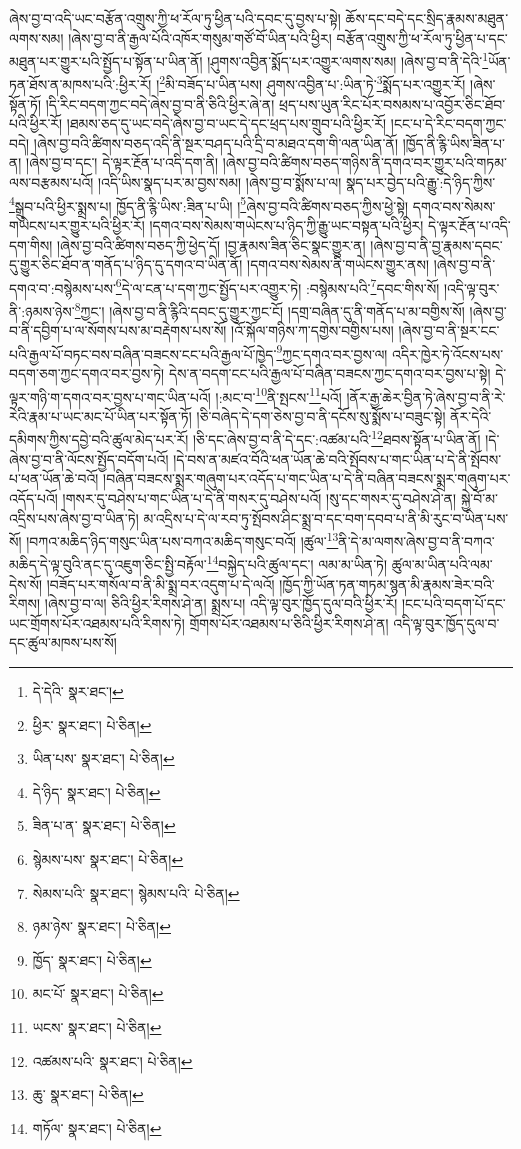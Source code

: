 ཞེས་བྱ་བ་འདི་ཡང་བརྩོན་འགྲུས་ཀྱི་ཕ་རོལ་ཏུ་ཕྱིན་པའི་དབང་དུ་བྱས་པ་སྟེ། ཆོས་དང་བདེ་དང་སྲིད་རྣམས་མཐུན་ལགས་སམ། །ཞེས་བྱ་བ་ནི་རྒྱལ་པོའི་འཁོར་གསུམ་གཙོ་བོ་ཡིན་པའི་ཕྱིར། བརྩོན་འགྲུས་ཀྱི་ཕ་རོལ་ཏུ་ཕྱིན་པ་དང་མཐུན་པར་གྱུར་པའི་སྤྱོད་པ་སྟོན་པ་ཡིན་ནོ། །ཤུགས་འབྱིན་སྨོད་པར་འགྱུར་ལགས་སམ། །ཞེས་བྱ་བ་ནི་དེའི་\footnote{དེ་དེའི་  སྣར་ཐང་། }ཡོན་ཏན་ཐོས་ན་མཁས་པའི་:ཕྱིར་རོ། །\footnote{ཕྱིར་  སྣར་ཐང་།  པེ་ཅིན། }མི་བཟོད་པ་ཡིན་པས། ཤུགས་འབྱིན་པ་:ཡིན་ཏེ་\footnote{ཡིན་པས་  སྣར་ཐང་།  པེ་ཅིན། }སྨོད་པར་འགྱུར་རོ། །ཞེས་སྟོན་ཏོ། །དི་རིང་བདག་ཀྱང་བདེ་ཞེས་བྱ་བ་ནི་ཅིའི་ཕྱིར་ཞེ་ན། ཕྲད་པས་ཡུན་རིང་པོར་བསམས་པ་འབྱོར་ཅིང་ཐོབ་པའི་ཕྱིར་རོ། །ཐམས་ཅད་དུ་ཡང་བདེ་ཞེས་བྱ་བ་ཡང་དེ་དང་ཕྲད་པས་གྲུབ་པའི་ཕྱིར་རོ། །ངང་པ་དེ་རིང་བདག་ཀྱང་བདེ། །ཞེས་བྱ་བའི་ཚིགས་བཅད་འདི་ནི་སྔར་བཤད་པའི་དྲི་བ་མཐའ་དག་གི་ལན་ཡིན་ནོ། །ཁྱོད་ནི་རྙི་ཡིས་ཟིན་པ་ན། །ཞེས་བྱ་བ་དང་། དེ་ལྟར་རྔོན་པ་འདི་དག་ནི། །ཞེས་བྱ་བའི་ཚིགས་བཅད་གཉིས་ནི་དགའ་བར་གྱུར་པའི་གཏམ་ལས་བརྩམས་པའོ། །འདི་ཡིས་སྣད་པར་མ་བྱས་སམ། །ཞེས་བྱ་བ་སྨོས་པ་ལ། སྣད་པར་བྱེད་པའི་རྒྱུ་:དེ་ཉིད་ཀྱིས་\footnote{དེ་ཉིད་  སྣར་ཐང་།  པེ་ཅིན། }སྒྲུབ་པའི་ཕྱིར་སྨྲས་པ། ཁྱོད་ནི་རྙི་ཡིས་:ཟིན་པ་ཡི། །\footnote{ཟིན་པ་ན་  སྣར་ཐང་།  པེ་ཅིན། }ཞེས་བྱ་བའི་ཚིགས་བཅད་ཀྱིས་ཕྱེ་སྟེ། དགའ་བས་སེམས་གཡེངས་པར་གྱུར་པའི་ཕྱིར་རོ། །དགའ་བས་སེམས་གཡེངས་པ་ཉིད་ཀྱི་རྒྱུ་ཡང་བསྟན་པའི་ཕྱིར། དེ་ལྟར་རྔོན་པ་འདི་དག་གིས། །ཞེས་བྱ་བའི་ཚིགས་བཅད་ཀྱི་ཕྱེད་དོ། །བྱ་རྣམས་ཟིན་ཅིང་སྣང་གྱུར་ན། །ཞེས་བྱ་བ་ནི་བྱ་རྣམས་དབང་དུ་གྱུར་ཅིང་ཐོབ་ན་གནོད་པ་ཉིད་དུ་དགའ་བ་ཡིན་ནོ། །དགའ་བས་སེམས་ནི་གཡེངས་གྱུར་ནས། །ཞེས་བྱ་བ་ནི་དགའ་བ་:བསྙེམས་པས་\footnote{སྙེམས་པས་  སྣར་ཐང་།  པེ་ཅིན། }དེ་ལ་ངན་པ་དག་ཀྱང་སྤྱོད་པར་འགྱུར་ཏེ། :བསྙེམས་པའི་\footnote{སེམས་པའི་  སྣར་ཐང་། སྙེམས་པའི་  པེ་ཅིན། }དབང་གིས་སོ། །འདི་ལྟ་བུར་ནི་:ཉམས་ཉེས་\footnote{ཉམ་ཉེས་  སྣར་ཐང་།  པེ་ཅིན། }ཀྱང་། །ཞེས་བྱ་བ་ནི་རྙིའི་དབང་དུ་གྱུར་ཀྱང་ངོ། །དགྲ་བཞིན་དུ་ནི་གནོད་པ་མ་བགྱིས་སོ། །ཞེས་བྱ་བ་ནི་དབྱིག་པ་ལ་སོགས་པས་མ་བརྡེགས་པས་སོ། །འོ་སྐོལ་གཉིས་ཀ་དགྱེས་བགྱིས་པས། །ཞེས་བྱ་བ་ནི་སྔར་ངང་པའི་རྒྱལ་པོ་བཏང་བས་བཞིན་བཟངས་ངང་པའི་རྒྱལ་པོ་ཁྱེད་\footnote{ཁྱོད་  སྣར་ཐང་།  པེ་ཅིན། }ཀྱང་དགའ་བར་བྱས་ལ། འདིར་ཁྱེར་ཏེ་འོངས་པས་བདག་ཅག་ཀྱང་དགའ་བར་བྱས་ཏེ། དེས་ན་བདག་ངང་པའི་རྒྱལ་པོ་བཞིན་བཟངས་ཀྱང་དགའ་བར་བྱས་པ་སྟེ། དེ་ལྟར་གཉི་ག་དགའ་བར་བྱས་པ་གང་ཡིན་པའོ། །:མང་བ་\footnote{མང་པོ་  སྣར་ཐང་།  པེ་ཅིན། }ནི་སྤངས་\footnote{ཡངས་  སྣར་ཐང་།  པེ་ཅིན། }པའོ། །ནོར་རྒྱ་ཆེར་བྱིན་ཏེ་ཞེས་བྱ་བ་ནི་རེ་རེའི་རྣམ་པ་ཡང་མང་པོ་ཡིན་པར་སྟོན་ཏོ། །ཅི་བཞེད་དེ་དག་ཅེས་བྱ་བ་ནི་དངོས་སུ་སྨོས་པ་བཟུང་སྟེ། ནོར་དེའི་དམིགས་ཀྱིས་དབྱེ་བའི་ཚུལ་མེད་པར་རོ། །ཅི་དང་ཞེས་བྱ་བ་ནི་དེ་དང་:འཚམ་པའི་\footnote{འཚམས་པའི་  སྣར་ཐང་།  པེ་ཅིན། }ཐབས་སྟོན་པ་ཡིན་ནོ། །དེ་ཞེས་བྱ་བ་ནི་ལོངས་སྤྱོད་བདོག་པའོ། །དེ་བས་ན་མཛའ་བོའི་ཕན་ཡོན་ཆེ་བའི་སྤོབས་པ་གང་ཡིན་པ་དེ་ནི་སྤོབས་པ་ཕན་ཡོན་ཆེ་བའོ། །བཞིན་བཟངས་སྨྲར་གཞུག་པར་འདོད་པ་གང་ཡིན་པ་དེ་ནི་བཞིན་བཟངས་སྨྲར་གཞུག་པར་འདོད་པའོ། །གསར་དུ་བཤེས་པ་གང་ཡིན་པ་དེ་ནི་གསར་དུ་བཤེས་པའོ། །སུ་དང་གསར་དུ་བཤེས་ཤེ་ན། སྐྱེ་བོ་མ་འདྲིས་པས་ཞེས་བྱ་བ་ཡིན་ཏེ། མ་འདྲིས་པ་དེ་ལ་རབ་ཏུ་སྤོབས་ཤིང་སྨྲ་བ་དང་བག་དབབ་པ་ནི་མི་རུང་བ་ཡིན་པས་སོ། །བཀའ་མཆིད་ཉིད་གསུང་ཡིན་པས་བཀའ་མཆིད་གསུང་བའོ། །ཚུལ་\footnote{ཆུ་  སྣར་ཐང་།  པེ་ཅིན། }ནི་དེ་མ་ལགས་ཞེས་བྱ་བ་ནི་བཀའ་མཆིད་དེ་ལྟ་བུའི་ནང་དུ་འཇུག་ཅིང་སྤྱི་བརྟོལ་\footnote{གཏོལ་  སྣར་ཐང་།  པེ་ཅིན། }བསྐྱེད་པའི་ཚུལ་དང་། ལམ་མ་ཡིན་ཏེ། ཚུལ་མ་ཡིན་པའི་ལམ་དེས་སོ། །བཟོད་པར་གསོལ་བ་ནི་མི་སྨྲ་བར་འདུག་པ་དེ་ལའོ། །ཁྱོད་ཀྱི་ཡོན་ཏན་གཏམ་སྙན་མི་རྣམས་ཟེར་བའི་རིགས། །ཞེས་བྱ་བ་ལ། ཅིའི་ཕྱིར་རིགས་ཤེ་ན། སྨྲས་པ། འདི་ལྟ་བུར་ཁྱོད་དུལ་བའི་ཕྱིར་རོ། །ངང་པའི་བདག་པོ་དང་ཡང་གྲོགས་པོར་འཐམས་པའི་རིགས་ཏེ། གྲོགས་པོར་འཐམས་པ་ཅིའི་ཕྱིར་རིགས་ཤེ་ན། འདི་ལྟ་བུར་ཁྱོད་དུལ་བ་དང་ཚུལ་མཁས་པས་སོ། 